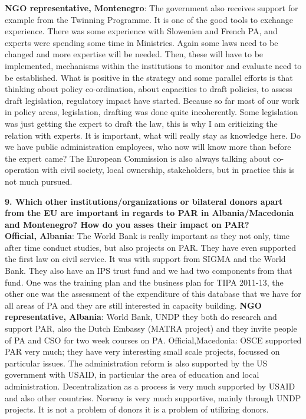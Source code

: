 \textbf{NGO representative, Montenegro}: The government also receives support for example from the Twinning Programme. It is one of the good tools to exchange experience. There was some experience with Slowenien and French PA, and experts were spending some time in Ministries. Again some laws need to be changed and more expertise will be needed. Then, these will have to be implemented, mechanisms within the institutions to monitor and evaluate need to be established. What is positive in the strategy and some parallel efforts is that thinking about policy co-ordination, about capacities to draft policies, to assess draft legislation, regulatory impact have started. Because so far most of our work in policy areas, legislation, drafting was done quite incoherently. Some legislation was just getting the expert to draft the law, this is why I am criticizing the relation with experts. It is important, what will really stay as knowledge here. Do we have public administration employees, who now will know more than before the expert came?  The European Commission is also always talking about co-operation with civil society, local ownership, stakeholders, but in practice this is not much pursued.\newpage
\textbf{9. Which other institutions/organizations or bilateral donors apart from the EU are important in regards to PAR in Albania/Macedonia and Montenegro? How do you asses their impact on PAR? }\\
\textbf{Official, Albania}: The World Bank is really important as they not only, time after time conduct studies, but also projects on PAR. They have even supported the first law on civil service. It was with support from SIGMA and the World Bank. They also have an IPS trust fund and we had two components from that fund. One was the training plan and the business plan for TIPA 2011-13, the other one was the assessment of the expenditure of this database that we have for all areas of PA and they are still interested in capacity building.
\textbf{NGO representative, Albania}: World Bank, UNDP they both do research and support PAR, also the Dutch Embassy (MATRA project) and they invite people of PA and CSO for two week courses on PA.
Official,Macedonia: OSCE supported PAR very much; they have very interesting small scale projects, focussed on particular issues. The administration reform is also supported by the US government with USAID, in particular the area of education and local administration. Decentralization as a process is very much supported by USAID and also other countries. Norway is very much supportive, mainly through UNDP projects. It is not a problem of donors it is a problem of utilizing donors. 
